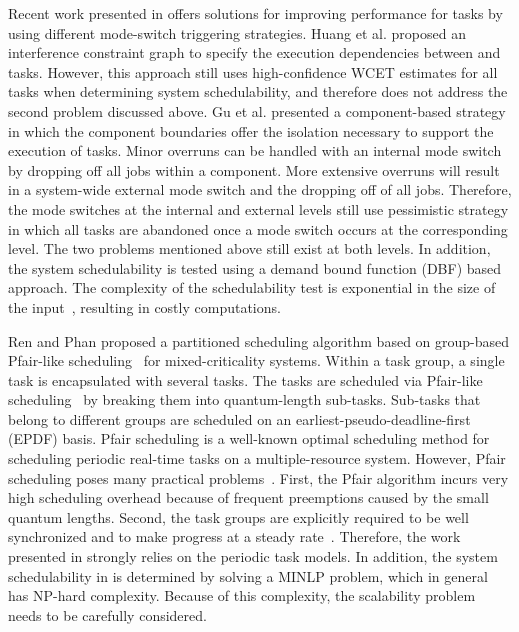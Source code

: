 \documentclass[10pt,journal,compsoc]{IEEEtran}
\begin{document}
Recent work presented in \cite{gu,ren,huang} offers solutions for improving performance for \lo tasks by using different mode-switch triggering strategies. Huang et al. \cite{huang} proposed an interference constraint graph to specify the execution dependencies between \hi and \lo tasks. However, this approach still uses high-confidence WCET estimates for all \hi tasks when determining system schedulability, and therefore does not address the second problem discussed above. Gu et al. \cite{gu} presented a component-based strategy in which the component boundaries offer the isolation necessary to support the execution of \lo tasks. Minor overruns can be handled with an internal mode switch by dropping off all \lo jobs within a component. More extensive overruns will result in a system-wide external mode switch and the dropping off of all \lo jobs. Therefore, the mode switches at the internal and external levels still use pessimistic strategy in which all \lo tasks are abandoned once a mode switch occurs at the corresponding level. The two problems mentioned above still exist at both levels. In addition, the system schedulability is tested using a demand bound function (DBF) based approach. The complexity of the schedulability test is exponential in the size of the input~\cite{gu}, resulting in costly computations.    

Ren and Phan \cite{ren} proposed a partitioned scheduling algorithm based on group-based Pfair-like scheduling~\cite{Pfairs} for mixed-criticality systems. Within a task group, a single \hi task is encapsulated with several \lo tasks. The tasks are scheduled via Pfair-like scheduling~\cite{Pfairs} by breaking them into quantum-length sub-tasks. Sub-tasks that belong to different groups are scheduled on an earliest-pseudo-deadline-first (EPDF) basis. Pfair scheduling is a well-known optimal scheduling method for scheduling periodic real-time tasks on a multiple-resource system. However, Pfair scheduling poses many practical problems~\cite{Pfairs}. First,  the Pfair algorithm incurs very high scheduling overhead because of frequent preemptions caused by the small quantum lengths. Second, the task groups are explicitly required to be well synchronized and to make progress at a steady rate~\cite{ZhuParis}. Therefore, the work presented in \cite{ren} strongly relies on the periodic task models. In addition, the system schedulability in \cite{ren} is determined by solving a MINLP problem, which in general has NP-hard complexity\cite{MINLP}. Because of  this complexity, the scalability problem needs to be carefully considered.
\end{document}
